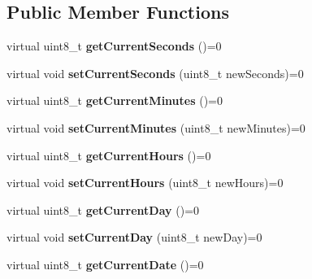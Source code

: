 \subsection*{Public Member Functions}
\begin{DoxyCompactItemize}
\item 
\mbox{\label{classreal_time_clock_a46bfe69dc650cc27e648ac7adb03afd0}} 
virtual uint8\+\_\+t {\bfseries get\+Current\+Seconds} ()=0
\item 
\mbox{\label{classreal_time_clock_a463a64d4861c75e26a80712e1dd50e6b}} 
virtual void {\bfseries set\+Current\+Seconds} (uint8\+\_\+t new\+Seconds)=0
\item 
\mbox{\label{classreal_time_clock_a8436f171be03d35a931004b3f3b144e9}} 
virtual uint8\+\_\+t {\bfseries get\+Current\+Minutes} ()=0
\item 
\mbox{\label{classreal_time_clock_a52da7366cd5f1e4c270eb87e7298da42}} 
virtual void {\bfseries set\+Current\+Minutes} (uint8\+\_\+t new\+Minutes)=0
\item 
\mbox{\label{classreal_time_clock_a2861a9bc75466a762b4cd8ce37193247}} 
virtual uint8\+\_\+t {\bfseries get\+Current\+Hours} ()=0
\item 
\mbox{\label{classreal_time_clock_a515d9de6067ae563bff5217da5100a23}} 
virtual void {\bfseries set\+Current\+Hours} (uint8\+\_\+t new\+Hours)=0
\item 
\mbox{\label{classreal_time_clock_a13b8ebc25275f183a1117402fc9e5e36}} 
virtual uint8\+\_\+t {\bfseries get\+Current\+Day} ()=0
\item 
\mbox{\label{classreal_time_clock_a4a80a695cbb55860921f92509fae0cd0}} 
virtual void {\bfseries set\+Current\+Day} (uint8\+\_\+t new\+Day)=0
\item 
\mbox{\label{classreal_time_clock_a910bce5ee911c18bd34a4154953ce2ac}} 
virtual uint8\+\_\+t {\bfseries get\+Current\+Date} ()=0
\item 
\mbox{\label{classreal_time_clock_a7db563a518ae7b87ca6d77860906e517}} 

\end{DoxyCompactItemize}
